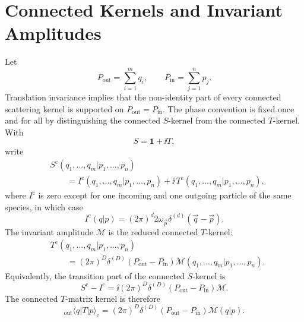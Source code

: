 \begin{center}
\end{center}

\section{Connected Kernels and Invariant Amplitudes}

Let
\[
  P_{\mathrm{out}}=\sum_{i=1}^m q_i,
  \qquad
  P_{\mathrm{in}}=\sum_{j=1}^n p_j .
\]
Translation invariance implies that the non-identity part of every connected
scattering kernel is supported on \(P_{\mathrm{out}}=P_{\mathrm{in}}\).  The
phase convention is fixed once and for all by distinguishing the connected
\(S\)-kernel from the connected \(T\)-kernel.  With
\[
  S=\mathbf 1+\ii T,
\]
write
\[
\begin{aligned}
&S^{\mathrm c}(q_1,\ldots,q_m|p_1,\ldots,p_n)
\\
&\qquad =
  I^{\mathrm c}(q_1,\ldots,q_m|p_1,\ldots,p_n)
  +
  \ii\,T^{\mathrm c}(q_1,\ldots,q_m|p_1,\ldots,p_n),
\end{aligned}
\]
where \(I^{\mathrm c}\) is zero except for one incoming and one outgoing
particle of the same species, in which case
\[
  I^{\mathrm c}(q|p)
  =
  (2\pi)^d2\omega_{\vec p}\delta^{(d)}(\vec q-\vec p).
\]
The invariant amplitude \(\mathcal M\) is the reduced connected \(T\)-kernel:
\[
\begin{aligned}
&T^{\mathrm c}(q_1,\ldots,q_m|p_1,\ldots,p_n)
\\
&\qquad =
  (2\pi)^D\delta^{(D)}(P_{\mathrm{out}}-P_{\mathrm{in}})
  \mathcal M(q_1,\ldots,q_m|p_1,\ldots,p_n).
\end{aligned}
\]
Equivalently, the transition part of the connected \(S\)-kernel is
\[
  S^{\mathrm c}-I^{\mathrm c}
  =
  \ii(2\pi)^D\delta^{(D)}(P_{\mathrm{out}}-P_{\mathrm{in}})\mathcal M .
\]
The connected \(T\)-matrix kernel is therefore
\[
  {}_{\mathrm{out}}\langle q|T|p\rangle_{\mathrm c}
  =
  (2\pi)^D\delta^{(D)}(P_{\mathrm{out}}-P_{\mathrm{in}})
  \mathcal M(q|p).
\]

